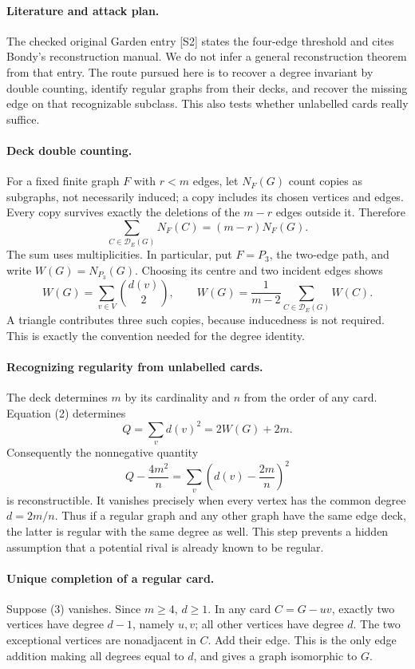 \documentclass[11pt,a4paper]{article}
\begin{document}
\paragraph{Literature and attack plan.}
The checked original Garden entry [S2] states the four-edge threshold and cites Bondy's reconstruction manual. We do not infer a general reconstruction theorem from that entry. The route pursued here is to recover a degree invariant by double counting, identify regular graphs from their decks, and recover the missing edge on that recognizable subclass. This also tests whether unlabelled cards really suffice.

\paragraph{Deck double counting.}
For a fixed finite graph $F$ with $r<m$ edges, let $N_F(G)$ count copies as subgraphs, not necessarily induced; a copy includes its chosen vertices and edges. Every copy survives exactly the deletions of the $m-r$ edges outside it. Therefore
\[
 \sum_{C\in\mathcal D_E(G)}N_F(C)=(m-r)N_F(G). \tag{1}
\]
The sum uses multiplicities. In particular, put $F=P_3$, the two-edge path, and write $W(G)=N_{P_3}(G)$. Choosing its centre and two incident edges shows
\[
 W(G)=\sum_{v\in V}\binom{d(v)}2,
 \qquad W(G)=\frac1{m-2}\sum_{C\in\mathcal D_E(G)}W(C). \tag{2}
\]
A triangle contributes three such copies, because inducedness is not required. This is exactly the convention needed for the degree identity.

\paragraph{Recognizing regularity from unlabelled cards.}
The deck determines $m$ by its cardinality and $n$ from the order of any card. Equation (2) determines
\[
 Q=\sum_vd(v)^2=2W(G)+2m.
\]
Consequently the nonnegative quantity
\[
 Q-\frac{4m^2}{n}=\sum_v\left(d(v)-\frac{2m}{n}\right)^2 \tag{3}
\]
is reconstructible. It vanishes precisely when every vertex has the common degree $d=2m/n$. Thus if a regular graph and any other graph have the same edge deck, the latter is regular with the same degree as well. This step prevents a hidden assumption that a potential rival is already known to be regular.

\paragraph{Unique completion of a regular card.}
Suppose (3) vanishes. Since $m\ge4$, $d\ge1$. In any card $C=G-uv$, exactly two vertices have degree $d-1$, namely $u,v$; all other vertices have degree $d$. The two exceptional vertices are nonadjacent in $C$. Add their edge. This is the only edge addition making all degrees equal to $d$, and gives a graph isomorphic to $G$.
\end{document}
